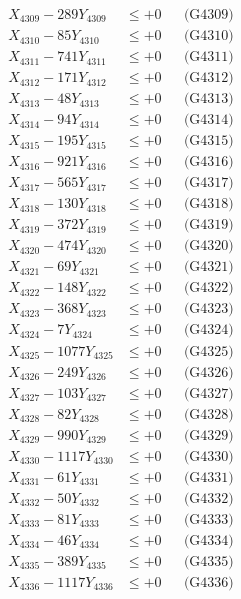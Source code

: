 \documentclass[a4paper,10pt]{article}
\begin{document}
{\begin{align}
X_{4309} - 289Y_{4309} &\leq +0 && \text{(G4309)} \\
X_{4310} - 85Y_{4310} &\leq +0 && \text{(G4310)} \\
\allowbreak
X_{4311} - 741Y_{4311} &\leq +0 && \text{(G4311)} \\
X_{4312} - 171Y_{4312} &\leq +0 && \text{(G4312)} \\
X_{4313} - 48Y_{4313} &\leq +0 && \text{(G4313)} \\
X_{4314} - 94Y_{4314} &\leq +0 && \text{(G4314)} \\
X_{4315} - 195Y_{4315} &\leq +0 && \text{(G4315)} \\
X_{4316} - 921Y_{4316} &\leq +0 && \text{(G4316)} \\
X_{4317} - 565Y_{4317} &\leq +0 && \text{(G4317)} \\
X_{4318} - 130Y_{4318} &\leq +0 && \text{(G4318)} \\
X_{4319} - 372Y_{4319} &\leq +0 && \text{(G4319)} \\
X_{4320} - 474Y_{4320} &\leq +0 && \text{(G4320)} \\
\allowbreak
X_{4321} - 69Y_{4321} &\leq +0 && \text{(G4321)} \\
X_{4322} - 148Y_{4322} &\leq +0 && \text{(G4322)} \\
X_{4323} - 368Y_{4323} &\leq +0 && \text{(G4323)} \\
X_{4324} - 7Y_{4324} &\leq +0 && \text{(G4324)} \\
X_{4325} - 1077Y_{4325} &\leq +0 && \text{(G4325)} \\
X_{4326} - 249Y_{4326} &\leq +0 && \text{(G4326)} \\
X_{4327} - 103Y_{4327} &\leq +0 && \text{(G4327)} \\
X_{4328} - 82Y_{4328} &\leq +0 && \text{(G4328)} \\
X_{4329} - 990Y_{4329} &\leq +0 && \text{(G4329)} \\
X_{4330} - 1117Y_{4330} &\leq +0 && \text{(G4330)} \\
\allowbreak
X_{4331} - 61Y_{4331} &\leq +0 && \text{(G4331)} \\
X_{4332} - 50Y_{4332} &\leq +0 && \text{(G4332)} \\
X_{4333} - 81Y_{4333} &\leq +0 && \text{(G4333)} \\
X_{4334} - 46Y_{4334} &\leq +0 && \text{(G4334)} \\
X_{4335} - 389Y_{4335} &\leq +0 && \text{(G4335)} \\
X_{4336} - 1117Y_{4336} &\leq +0 && \text{(G4336)} \\

\end{align}}
\end{document}

